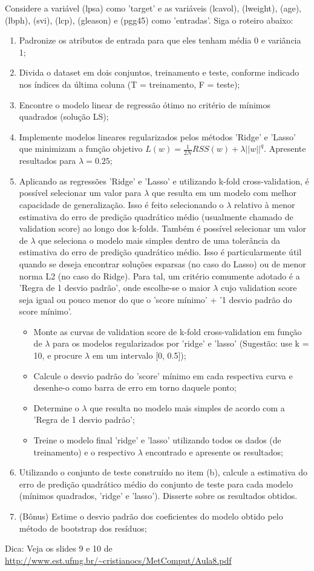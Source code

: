 Considere a variável (lpsa) como 'target' e as variáveis (lcavol), (lweight), (age), (lbph), (svi), (lcp), (gleason) e (pgg45) como 'entradas'. Siga o roteiro abaixo:
\begin{enumerate}[label=(\alph*)]
    \item Padronize os atributos de entrada para que eles tenham média 0 e variância 1;
    \item Divida o dataset em dois conjuntos, treinamento e teste, conforme indicado nos índices da última coluna (T = treinamento, F = teste);
    \item Encontre o modelo linear de regressão ótimo no critério de mínimos quadrados (solução LS);
    \item Implemente modelos lineares regularizados pelos métodos 'Ridge' e 'Lasso' que minimizam a função objetivo \( L(w) = \frac{1}{2N} RSS(w) + \lambda ||w||^q \). Apresente resultados para \( \lambda = 0.25 \);
    \item Aplicando as regressões 'Ridge' e 'Lasso' e utilizando k-fold cross-validation, é possível selecionar um valor para \( \lambda \) que resulta em um modelo com melhor capacidade de generalização. Isso é feito selecionando o \( \lambda \) relativo à menor estimativa do erro de predição quadrático médio (usualmente chamado de validation score) ao longo dos k-folds. Também é possível selecionar um valor de \( \lambda \) que seleciona o modelo mais simples dentro de uma tolerância da estimativa do erro de predição quadrático médio. Isso é particularmente útil quando se deseja encontrar soluções esparsas (no caso do Lasso) ou de menor norma L2 (no caso do Ridge). Para tal, um critério comumente adotado é a 'Regra de 1 desvio padrão', onde escolhe-se o maior \( \lambda \) cujo validation score seja igual ou pouco menor do que o 'score mínimo' + '1 desvio padrão do score mínimo'.
    \begin{itemize}[label=-]
        \item Monte as curvas de validation score de k-fold cross-validation em função de \( \lambda \) para os modelos regularizados por 'ridge' e 'lasso' (Sugestão: use k = 10, e procure \( \lambda \) em um intervalo [0, 0.5]);
        \item Calcule o desvio padrão do 'score' mínimo em cada respectiva curva e desenhe-o como barra de erro em torno daquele ponto;
        \item Determine o \( \lambda \) que resulta no modelo mais simples de acordo com a 'Regra de 1 desvio padrão';
        \item Treine o modelo final 'ridge' e 'lasso' utilizando todos os dados (de treinamento) e o respectivo \( \lambda \) encontrado e apresente os resultados;
    \end{itemize}
    \item Utilizando o conjunto de teste construído no item (b), calcule a estimativa do erro de predição quadrático médio do conjunto de teste para cada modelo (mínimos quadrados, 'ridge' e 'lasso'). Disserte sobre os resultados obtidos.
    \item (Bônus) Estime o desvio padrão dos coeficientes do modelo obtido pelo método de bootstrap dos resíduos;
\end{enumerate}

Dica: Veja os slides 9 e 10 de \url{http://www.est.ufmg.br/~cristianocs/MetComput/Aula8.pdf}
